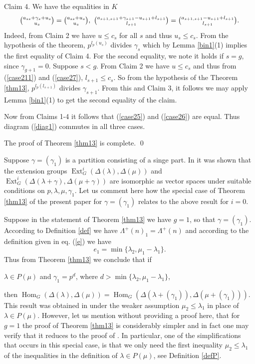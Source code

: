 \documentclass[ALCO,Unicode]{cedram}
\newcommand{\la}{\lambda}
\newcommand{\La}{\Lambda}
\DeclareMathOperator{\Hom}{Hom}
\DeclareMathOperator{\Ext}{Ext}
\numberwithin{equation}{section}
\begin{document}
 Claim 4. We have the equalities in $K$ 
 \begin{equation*}\label{eq115}\tbinom{a_{ss} + \gamma_s + u_s}{u_s}=\tbinom{a_{ss}  + u_s}{u_s}, \  \tbinom{a_{s+1,s+1}+\gamma_{s+1}-u_{s+1}+l_{s+1}}{l_{s+1}}=\tbinom{a_{s+1,s+1}-u_{s+1}+l_{s+1}}{l_{s+1}}.\end{equation*}
 Indeed, from Claim 2 we have  $u \le c_s$ for all $s$ and thus $u_s \le c_s$. From the hypothesis of the theorem, $p^{l_p(u_s)}$ divides $\gamma_s$ which by Lemma \ref{bin1}(1) implies the first equality of Claim 4. For the second equality, we note it holds if $s=g$, since $\gamma_{g+1}=0$. Suppose $s<g$. From Claim 2 we have  $u \le c_s$ and thus from (\ref{case211}) and (\ref{case27}), $l_{s+1} \le c_s$. So from the hypothesis of the Theorem \ref{thm13}, $p^{l_p(l_{s+1})}$ divides $\gamma_{s+1}$. From this and Claim 3, it follows we may apply Lemma \ref{bin1}(1) to get the second equality of the claim.
 
 Now from Claims 1-4 it follows that (\ref{case25}) and (\ref{case26}) are equal. Thus diagram (\ref{diag1}) commutes in all three cases.
 
 The proof of Theorem \ref{thm13} is complete. \qed

\begin{rema} Suppose $\gamma=(\gamma_1)$ is a partition consisting of a singe part. In \cite{MS4} it was shown that the extension groups $\Ext^i_G(\Delta(\lambda), \Delta(\mu))$ and $\Ext^i_G(\Delta(\lambda + \gamma), \Delta(\mu +\gamma))$ are isomorphic as vector spaces under suitable conditions on $p, \lambda, \mu, \gamma_1$. Let us comment here how the special case of Theorem \ref{thm13} of the present paper for $\gamma = (\gamma_1)$ relates to the above result for $i=0$. 
	
	Suppose in the statement of Theorem \ref{thm13} we have $g=1$, so that $\gamma=(\gamma_1)$. According to Definition \ref{def} we have $\La^+(n)_1=\La^+(n)$ and according to the definition given in eq. (\ref{e}) we have \[e_1 =\min\{\lambda_{2}, \mu_1-\lambda_1\}.\] Thus from Theorem \ref{thm13} we conclude that if \begin{center}
		$\lambda \in P(\mu)$ and $\gamma_1 =p^d$, where $d > \min\{\lambda_{2}, \mu_1-\lambda_1\}$,
	\end{center} then $\Hom_G(\Delta(\la),\Delta(\mu)) = \Hom_{G}(\Delta(\la+(\gamma_1)), \Delta(\mu+(\gamma_1)))$. This result was obtained in \cite[Theorem 6.1]{MS4} under the weaker assumption $\mu_2 \le \lambda_1$ in place of $\lambda \in P(\mu)$.  However, let us mention without providing a proof here, that for $g=1$ the proof of Theorem \ref{thm13} is considerably simpler and in fact one may verify that it reduces to the proof of \cite[Theorem 6.1]{MS4}. In particular, one of the simplifications that occurs in this special case, is that we only need the first inequality $\mu_2 \le  \la_1$ of the inequalities in the definition of $\la \in P(\mu)$, see Definition \ref{defP}.
	\end{rema}
	
\end{document}
